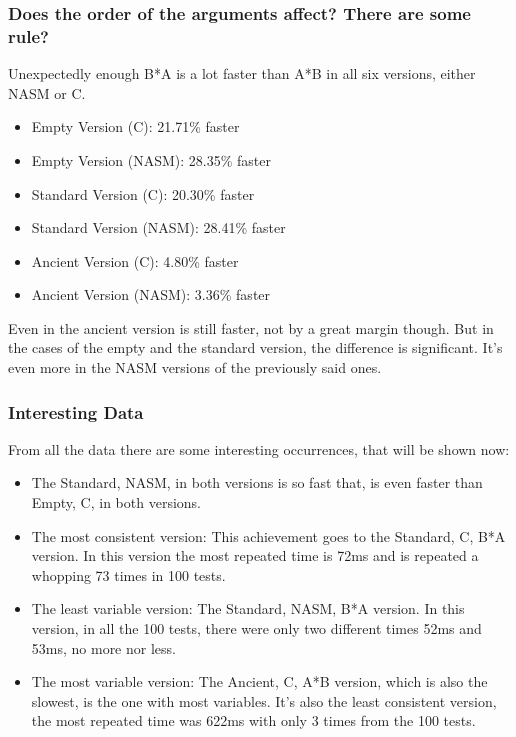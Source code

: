 \documentclass[legalpaper,12pt]{article}
\begin{document}
    \subsubsection{Does the order of the arguments affect? There are some rule?}
        \justifying
        Unexpectedly enough B*A is a lot faster than A*B in all six versions, either NASM or C.
        \begin{itemize}
            \item Empty Version (C): 21.71\% faster
            \item Empty Version (NASM): 28.35\% faster
            \item Standard Version (C): 20.30\% faster
            \item Standard Version (NASM): 28.41\% faster
            \item Ancient Version (C): 4.80\% faster
            \item Ancient Version (NASM): 3.36\% faster
        \end{itemize}
        Even in the ancient version is still faster, not by a great margin though. But in the cases of the empty and the standard version, the difference is significant. It's even more in the NASM versions of the previously said ones.
    \subsubsection{Interesting Data}
        From all the data there are some interesting occurrences, that will be shown now:
        \begin{itemize}
            \item The Standard, NASM, in both versions is so fast that, is even faster than Empty, C, in both versions.
            \item The most consistent version: This achievement goes to the Standard, C, B*A version. In this version the most repeated time is 72ms and is repeated a whopping 73 times in 100 tests.
            \item The least variable version: The Standard, NASM, B*A version. In this version, in all the 100 tests, there were only two different times 52ms and 53ms, no more nor less.
            \item The most variable version: The Ancient, C, A*B version, which is also the slowest, is the one with most variables. It's also the least consistent version, the most repeated time was 622ms with only 3 times from the 100 tests.
        \end{itemize}
\newpage
\end{document}
